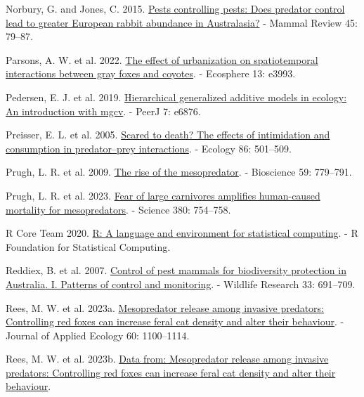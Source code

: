 \documentclass[preprint, 3p, authoryear]{elsarticle} %
\newlength{\cslhangindent}
\newlength{\cslentryspacingunit} %
\newenvironment{CSLReferences}[2] %
 {%
  \setlength{\parindent}{0pt}
  \ifodd #1
  \let\oldpar\par
  \def\par{\hangindent=\cslhangindent\oldpar}
  \fi
  \setlength{\parskip}{#2\cslentryspacingunit}
 }%
 {}
\begin{document}
\begin{CSLReferences}{1}{0}
\leavevmode{}%
Norbury, G. and Jones, C. 2015. \href{https://doi.org/10.1111/mam.12034}{Pests controlling pests: Does predator control lead to greater {E}uropean rabbit abundance in {A}ustralasia?} - Mammal Review 45: 79--87.

\leavevmode{}%
Parsons, A. W. et al. 2022. \href{https://doi.org/10.1002/ecs2.3993}{The effect of urbanization on spatiotemporal interactions between gray foxes and coyotes}. - Ecosphere 13: e3993.

\leavevmode{}%
Pedersen, E. J. et al. 2019. \href{https://doi.org/10.7717/peerj.6876}{Hierarchical generalized additive models in ecology: An introduction with mgcv}. - PeerJ 7: e6876.

\leavevmode{}%
Preisser, E. L. et al. 2005. \href{https://doi.org/10.1890/04-0719}{Scared to death? The effects of intimidation and consumption in predator--prey interactions}. - Ecology 86: 501--509.

\leavevmode{}%
Prugh, L. R. et al. 2009. \href{https://doi.org/10.1525/bio.2009.59.9.9}{The rise of the mesopredator}. - Bioscience 59: 779--791.

\leavevmode{}%
Prugh, L. R. et al. 2023. \href{https://doi.org/10.1126/science.adf2472}{Fear of large carnivores amplifies human-caused mortality for mesopredators}. - Science 380: 754--758.

\leavevmode{}%
R Core Team 2020. \href{https://www.R-project.org/}{R: A language and environment for statistical computing}. - R Foundation for Statistical Computing.

\leavevmode{}%
Reddiex, B. et al. 2007. \href{https://doi.org/10.1071/WR05102}{Control of pest mammals for biodiversity protection in {{A}ustralia}. I. Patterns of control and monitoring}. - Wildlife Research 33: 691--709.

\leavevmode{}%
Rees, M. W. et al. 2023a. \href{https://doi.org/10.1111/1365-2664.14402}{Mesopredator release among invasive predators: Controlling red foxes can increase feral cat density and alter their behaviour}. - Journal of Applied Ecology 60: 1100--1114.

\leavevmode{}%
Rees, M. W. et al. 2023b. \href{https://doi.org/10.5061/dryad.69p8cz95w}{Data from: Mesopredator release among invasive predators: Controlling red foxes can increase feral cat density and alter their behaviour}.


\end{CSLReferences}
\end{document}
